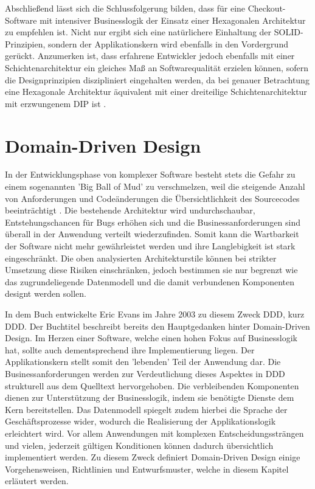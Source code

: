 Abschließend lässt sich die Schlussfolgerung bilden, dass für eine Checkout-Software mit intensiver Businesslogik der Einsatz einer Hexagonalen Architektur zu empfehlen ist. Nicht nur ergibt sich eine natürlichere Einhaltung der SOLID-Prinzipien, sondern der Applikationskern wird ebenfalls in den Vordergrund gerückt. Anzumerken ist, dass erfahrene Entwickler jedoch ebenfalls mit einer Schichtenarchitektur ein gleiches Maß an Softwarequalität erzielen können, sofern die Designprinzipien diszipliniert eingehalten werden, da bei genauer Betrachtung eine Hexagonale Architektur äquivalent mit einer dreiteilige Schichtenarchitektur mit erzwungenem \acrlong{DIP} ist \cite{Seemann.2013} \cite[S. 125ff.]{Vernon.2015}. 

\section{Domain-Driven Design}

In der Entwicklungsphase von komplexer Software besteht stets die Gefahr zu einem sogenannten 'Big Ball of Mud' zu verschmelzen, weil die steigende Anzahl von Anforderungen und Codeänderungen die Übersichtlichkeit des Sourcecodes beeinträchtigt \cite{bbom.1999}. Die bestehende Architektur wird undurchschaubar, Entstehungschancen für Bugs erhöhen sich und die Businessanforderungen sind überall in der Anwendung verteilt wiederzufinden. Somit kann die Wartbarkeit der Software nicht mehr gewährleistet werden und ihre Langlebigkeit ist stark eingeschränkt. Die oben analysierten Architekturstile können bei strikter Umsetzung diese Risiken einschränken, jedoch bestimmen sie nur begrenzt wie das zugrundeliegende Datenmodell und die damit verbundenen Komponenten designt werden sollen. 

In dem Buch  entwickelte Eric Evans im Jahre 2003 zu diesem Zweck \acrlong{DDD}, kurz \acrshort{DDD}. Der Buchtitel beschreibt bereits den Hauptgedanken hinter Domain-Driven Design. Im Herzen einer Software, welche einen hohen Fokus auf Businesslogik hat, sollte auch dementsprechend ihre Implementierung liegen. Der Applikationskern stellt somit den 'lebenden' Teil der Anwendung dar. Die Businessanforderungen werden zur Verdeutlichung dieses Aspektes in DDD strukturell aus dem Quelltext hervorgehoben. Die verbleibenden Komponenten dienen zur Unterstützung der Businesslogik, indem sie benötigte Dienste dem Kern bereitstellen. Das Datenmodell spiegelt zudem hierbei die Sprache der Geschäftsprozesse wider, wodurch die Realisierung der Applikationslogik erleichtert wird. Vor allem Anwendungen mit komplexen Entscheidungssträngen und vielen, jederzeit gültigen Konditionen können dadurch übersichtlich implementiert werden. Zu diesem Zweck definiert Domain-Driven Design einige Vorgehensweisen, Richtlinien und Entwurfsmuster, welche in diesem Kapitel erläutert werden. \cite{Evans.2011, Vernon.2015}

